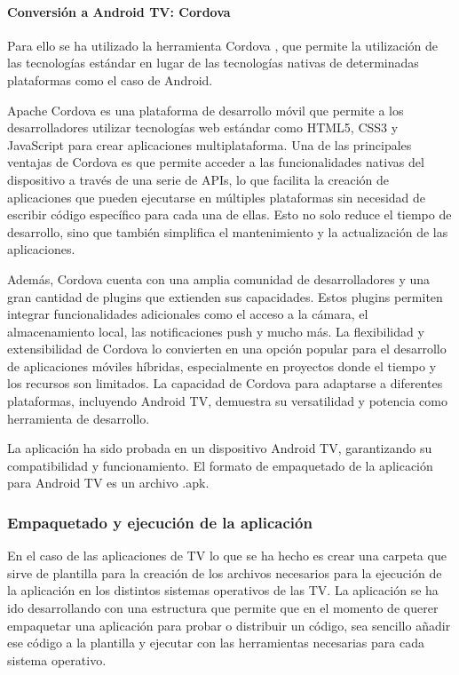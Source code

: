 \paragraph{Conversión a Android TV: Cordova}
\label{par:adaptabilidad_android_tv_conversión}
Para ello se ha utilizado la herramienta Cordova \cite{Cordova}, que permite la utilización de las tecnologías
estándar en lugar de las tecnologías nativas de determinadas plataformas como el caso de Android.

Apache Cordova es una plataforma de desarrollo móvil que permite a los desarrolladores utilizar tecnologías web 
estándar como HTML5, CSS3 y JavaScript para crear aplicaciones multiplataforma. Una de las principales ventajas 
de Cordova es que permite acceder a las funcionalidades nativas del dispositivo a través de una serie de APIs, 
lo que facilita la creación de aplicaciones que pueden ejecutarse en múltiples plataformas sin necesidad de 
escribir código específico para cada una de ellas. Esto no solo reduce el tiempo de desarrollo, sino que 
también simplifica el mantenimiento y la actualización de las aplicaciones.

Además, Cordova cuenta con una amplia comunidad de desarrolladores y una gran cantidad de plugins que 
extienden sus capacidades. Estos plugins permiten integrar funcionalidades adicionales como el acceso 
a la cámara, el almacenamiento local, las notificaciones push y mucho más. La flexibilidad y extensibilidad 
de Cordova lo convierten en una opción popular para el desarrollo de aplicaciones móviles híbridas, 
especialmente en proyectos donde el tiempo y los recursos son limitados. La capacidad de Cordova para 
adaptarse a diferentes plataformas, incluyendo Android TV, demuestra su versatilidad y potencia 
como herramienta de desarrollo.

La aplicación ha sido probada en un dispositivo Android TV, garantizando su compatibilidad y funcionamiento.
El formato de empaquetado de la aplicación para Android TV es un archivo .apk.


\subsubsection{Empaquetado y ejecución de la aplicación}
\label{subsubsec:adaptabilidad_empaquetado_ejecucion}

En el caso de las aplicaciones de TV lo que se ha hecho es crear una carpeta que sirve de plantilla para
la creación de los archivos necesarios para la ejecución de la aplicación en los distintos sistemas operativos
de las TV. La aplicación se ha ido desarrollando con una estructura que permite que en el momento de querer empaquetar
una aplicación para probar o distribuir un código, sea sencillo añadir ese código a la plantilla y ejecutar con 
las herramientas necesarias para cada sistema operativo.


